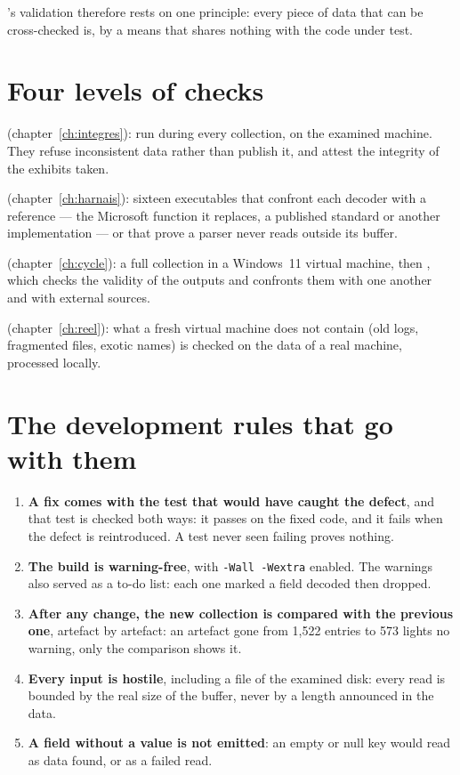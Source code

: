 \documentclass[11pt,a4paper,oneside]{report}
\begin{document}
\wac{}'s validation therefore rests on one principle: every piece of data that
can be cross-checked is, by a means that shares nothing with the code under
test.

\section{Four levels of checks}

\begin{description}[leftmargin=0pt,itemsep=0.5em]
  \item[The checks built into \wac{}] (chapter~\ref{ch:integres}): run during
    every collection, on the examined machine. They refuse inconsistent data
    rather than publish it, and attest the integrity of the exhibits taken.
  \item[The test programs] (chapter~\ref{ch:harnais}): sixteen executables
    that confront each decoder with a reference — the Microsoft function it
    replaces, a published standard or another implementation — or that prove
    a parser never reads outside its buffer.
  \item[The automatic cycle and its checks] (chapter~\ref{ch:cycle}): a full
    collection in a Windows~11 virtual machine, then ,
    which checks the validity of the outputs and confronts them with one
    another and with external sources.
  \item[Cross-checks on a real collection] (chapter~\ref{ch:reel}): what a
    fresh virtual machine does not contain (old logs, fragmented files, exotic
    names) is checked on the data of a real machine, processed locally.
\end{description}

\section{The development rules that go with them}

\begin{enumerate}
  \item \textbf{A fix comes with the test that would have caught the defect},
    and that test is checked both ways: it passes on the fixed code, and it
    fails when the defect is reintroduced. A test never seen failing proves
    nothing.
  \item \textbf{The build is warning-free}, with \texttt{-Wall -Wextra}
    enabled. The warnings also served as a to-do list: each one marked a field
    decoded then dropped.
  \item \textbf{After any change, the new collection is compared with the
    previous one}, artefact by artefact: an artefact gone from 1,522 entries to
    573 lights no warning, only the comparison shows it.
  \item \textbf{Every input is hostile}, including a file of the examined disk:
    every read is bounded by the real size of the buffer, never by a length
    announced in the data.
  \item \textbf{A field without a value is not emitted}: an empty or null key
    would read as data found, or as a failed read.
\end{enumerate}
\end{document}
